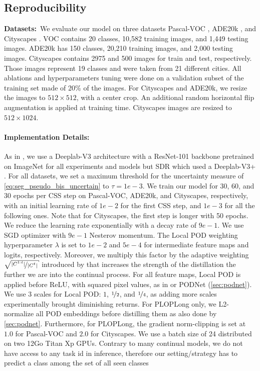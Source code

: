 \subsection{Reproducibility}

\noindent\textbf{Datasets:\,} We evaluate our model on three datasets Pascal-VOC
\citep{everingham2015pascalvoc}, ADE20k \citep{zhou2017adedataset}, and Cityscapes
\citep{cordts2016cityscapes}. VOC contains 20 classes, 10,582 training images, and 1,449 testing
images. ADE20k has 150 classes, 20,210 training images, and 2,000 testing images. Cityscapes
contains 2975 and 500 images for train and test, respectively. Those images represent 19 classes and
were taken from 21 different cities. All ablations and hyperparameters tuning were done on a
validation subset of the training set made of 20\% of the images. For Cityscapes and ADE20k, we
resize the images to $512 \times 512$, with a center crop. An additional random horizontal flip
augmentation is applied at training time. Cityscapes images are resized to $512 \times 1024$.

\paragraph{Implementation Details:} As in \citet{cermelli2020modelingthebackground}, we use a
Deeplab-V3 \citep{chen2017deeplabv3} architecture with a ResNet-101 \citep{he2016resnet} backbone
pretrained on ImageNet \citep{deng2009imagenet} for all experiments and models but SDR
\citep{michieli2021sdr} which used a Deeplab-V3+ \citep{chen2018deeplabv3plus}. For all datasets, we
set a maximum threshold for the uncertainty measure of \autoref{eq:seg_pseudo_bis_uncertain} to
$\tau=1e-3$. We train our model for 30, 60, and 30 epochs per \ac{CSS} step on Pascal-VOC, ADE20k,
and Cityscapes, respectively, with an initial learning rate of $1e-2$ for the first \ac{CSS} step,
and $1e-3$ for all the following ones. Note that for Cityscapes, the first step is longer with 50
epochs. We reduce the learning rate exponentially with a decay rate of $9e-1$. We use SGD optimizer
with $9e-1$ Nesterov momentum. The Local POD weighting hyperparameter $\lambda$ is set to $1e-2$ and
$5e-4$ for intermediate feature maps and logits, respectively. Moreover, we multiply this factor by
the adaptive weighting $\sqrt{\nicefrac{|C^{1:t}|}{|C^{t}|}}$ introduced by \citet{hou2019ucir} that
increases the strength of the distillation the further we are into the continual process. For all
feature maps, Local POD is applied before ReLU, with squared pixel values, as in
\citet{zagoruyko2016distillation_attention} or PODNet (\autoref{sec:podnet}). We use 3 scales for
Local POD: $1$, $\nicefrac{1}{2}$, and $\nicefrac{1}{4}$, as adding more scales experimentally
brought diminishing returns. For PLOPLong only, we L2-normalize all POD embeddings before distilling
them as also done by \autoref{sec:podnet}. Furthermore, for PLOPLong, the gradient norm-clipping is
set at $1.0$ for Pascal-VOC and $2.0$ for Cityscapes. We use a batch size of 24 distributed on two
12Go Titan Xp GPUs. Contrary to many continual models, we do not have access to any task id in
inference, therefore our setting/strategy has to predict a class among the set of all seen classes


